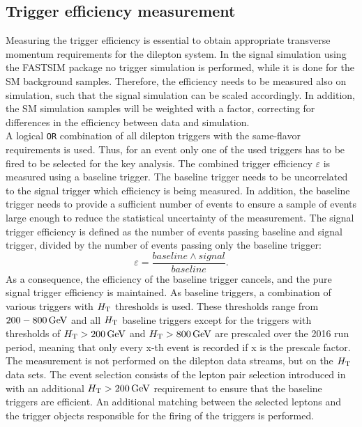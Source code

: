 \subsection*{Trigger efficiency measurement}
Measuring the trigger efficiency is essential to obtain appropriate transverse momentum requirements for the dilepton system. In the signal simulation using the \textsc{FASTSIM} package no trigger simulation is performed, while it is done for the SM background samples. Therefore, the efficiency needs to be measured also on simulation, such that the signal simulation can be scaled accordingly. In addition, the SM simulation samples will be weighted with a factor, correcting for differences in the efficiency between data and simulation.\\
A logical \texttt{OR} combination of all dilepton triggers with the same-flavor requirements is used. Thus, for an event only one of the used triggers has to be fired to be selected for the key analysis. The combined trigger efficiency $\varepsilon$ is measured using a baseline trigger. The baseline trigger needs to be uncorrelated to the signal trigger which efficiency is being measured. In addition, the baseline trigger needs to provide a sufficient number of events to ensure a sample of events large enough to reduce the statistical uncertainty of the measurement. The signal trigger efficiency is defined as the number of events passing baseline and signal trigger, divided by the number of events passing only the baseline trigger:
\begin{equation}
 \varepsilon=\frac{baseline \wedge signal}{baseline}.
\end{equation}
As a consequence, the efficiency of the baseline trigger cancels, and the pure signal trigger efficiency is maintained. As baseline triggers, a combination of various triggers with $H_{\mathrm{T}}$ thresholds is used. These thresholds range from $200-800\,\text{Ge\hspace{-.08em}V}$ and all $H_{\mathrm{T}}$ baseline triggers except for the triggers with thresholds of $H_{\mathrm{T}}>200\,\text{Ge\hspace{-.08em}V}$ and $H_{\mathrm{T}}>800\,\text{Ge\hspace{-.08em}V}$ are prescaled over the 2016 run period, meaning that only every x-th event is recorded if x is the prescale factor. The measurement is not performed on the dilepton data streams, but on the $H_{\mathrm{T}}$ data sets. The event selection consists of the lepton pair selection introduced in  with an additional $H_{\mathrm{T}}>200\,\text{Ge\hspace{-.08em}V}$ requirement to ensure that the baseline triggers are efficient. An additional matching between the selected leptons and the trigger objects responsible for the firing of the triggers is performed.\\
